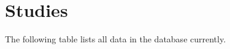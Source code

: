 %

\chapter{Studies}

The following table lists all data in the database currently.

\begin{center}
    \footnotesize
    
\end{center}
